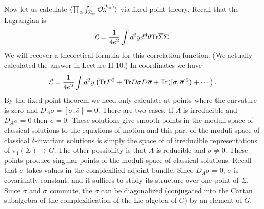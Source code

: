 Now let us calculate $\langle\prod_\alpha\int_{\Sigma_\alpha}{\cal
O}_\alpha^{(k_\alpha)}\rangle $ via  fixed point theory.
Recall that the Lagrangian is
$${\cal L}=\frac{1}{4e^2}\int d^2yd^4\theta{\rm
Tr}\overline\Sigma\Sigma.$$ 
We will recover a theoretical formula for this correlation function.
(We actually calculated the answer in Lecture
II-10.) 
In coordinates we have
\begin{equation}\label{lag}
{\cal L}=\frac{1}{4e^2}\int d^2y\left({\rm Tr}F^2+{\rm Tr}D\sigma
D\overline\sigma +{\rm
Tr}([\sigma,\overline\sigma]^2)+\cdots\right).
\end{equation}
By the fixed point theorem we need only calculate at points where the
curvature is zero and $D_A\sigma=[\sigma,\overline\sigma]=0$. 
There are two cases.
If $A$ is irreducible and $D_A\sigma=0$ then $\sigma=0$. These
solutions give  smooth points in the moduli space of classical
solutions to the equations of motion and this part of the
moduli space of classical $\delta$-invariant solutions is simply the
space of of 
irreducible representations of
$\pi_1(\Sigma)\to G$. The other possibility is that $A$ is reducible
and $\sigma\not=0$. These points produce singular points of the moduli
space of classical solutions.  Recall that $\sigma$
takes values in the 
complexified adjoint bundle.  Since $D_A\sigma=0$, $\sigma$ is
covariantly constant, and it suffices to study its structure over one
point of $\Sigma$. Since $\sigma$ and
$\overline\sigma$ commute, the $\sigma$ can be diagonalized
(conjugated into the Cartan subalgebra of the complexification of the
Lie algebra of $G$) by an element of $G$.

